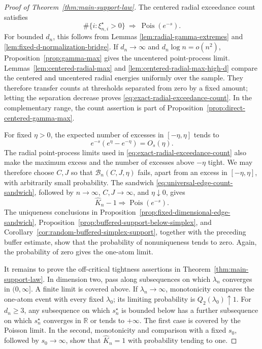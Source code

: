 \begin{proof}[Proof of Theorem~\ref{thm:main-support-law}]
The centered radial exceedance count satisfies
\begin{equation}
\label{eq:exact-radial-exceedance-count}
 \#\{i:\xi_{n,i}^\star>0\}
 \ \Rightarrow\ \operatorname{Pois}(e^{-s}).
\end{equation}
For bounded \(d_n\), this follows from Lemmas
\ref{lem:radial-gamma-extremes} and
\ref{lem:fixed-d-normalization-bridge}. If \(d_n\to\infty\) and
\(d_n\log n=o(n^2)\), Proposition~\ref{prop:gamma-max} gives the uncentered
point-process limit. Lemmas~\ref{lem:centered-radial-max} and
\ref{lem:centered-radial-max-high-d} compare the centered and uncentered
radial energies uniformly over the sample. They therefore transfer counts at
thresholds separated from zero by a fixed amount; letting the separation
decrease proves \eqref{eq:exact-radial-exceedance-count}. In the complementary
range, the count assertion is part of
Proposition~\ref{prop:direct-centered-gamma-max}.

For fixed \(\eta>0\), the expected number of excesses in
\([-\eta,\eta]\) tends to
\[
 e^{-s}(e^\eta-e^{-\eta})=O_s(\eta).
\]
The radial point-process limits used in
\eqref{eq:exact-radial-exceedance-count} also make the maximum excess and
the number of excesses above \(-\eta\) tight. We may therefore choose
\(C,J\) so that
\(\mathcal B_n(C,J,\eta)\) fails, apart from an excess in
\([-\eta,\eta]\), with arbitrarily small probability. The sandwich
\eqref{eq:universal-edge-count-sandwich}, followed by \(n\to\infty\),
\(C,J\to\infty\), and \(\eta\downarrow0\), gives
\[
 \widehat K_n-1\Rightarrow\operatorname{Pois}(e^{-s}).
\]
The uniqueness conclusions in
Proposition~\ref{prop:fixed-dimensional-edge-sandwich},
Proposition~\ref{prop:buffered-support-below-simplex}, and
Corollary~\ref{cor:random-buffered-simplex-support}, together with the
preceding buffer estimate, show that the probability of nonuniqueness tends
to zero.
Again, the probability of zero gives the one-atom limit.

It remains to prove the off-critical tightness assertions in
Theorem~\ref{thm:main-support-law}. In dimension two, pass
along subsequences on which \(\lambda_n\) converges in
\((0,\infty]\). A finite limit is covered above. If
\(\lambda_n\to\infty\), monotonicity compares the one-atom event with every
fixed \(\lambda_0\); its limiting probability is
\(Q_2(\lambda_0)\uparrow1\).  For \(d_n\ge3\), any subsequence on which
\(s_n^\star\) is bounded below has a further subsequence on which
\(s_n^\star\) converges in \(\mathbb R\) or tends to \(+\infty\).
The first case is covered by the Poisson limit. In the second, monotonicity
and comparison with a fixed \(s_0\), followed by \(s_0\to\infty\), show that
\(\widehat K_n=1\) with probability tending to one.
\end{proof}

